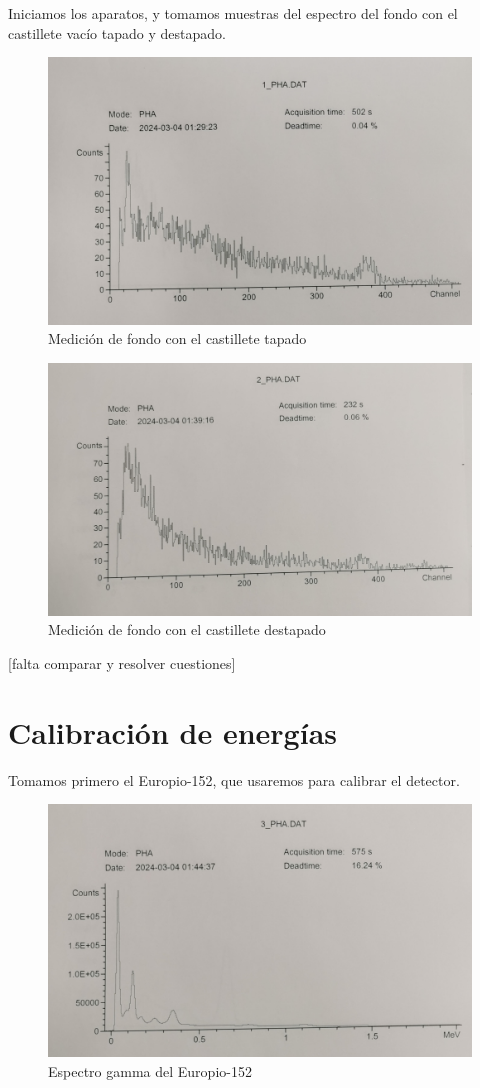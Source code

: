 \documentclass[a4paper,12pt,spanish]{article}
\begin{document}
	Iniciamos los aparatos, y tomamos muestras del espectro del fondo con el castillete vacío tapado y destapado.
	
	
\begin{figure}[H]
	\centering
	\includegraphics[width=0.7\linewidth]{../graficas_procesadas/PHA_1}
	\caption{Medición de fondo con el castillete tapado}
	\label{fig:pha1}
\end{figure}
	
	
\begin{figure}[H]
	\centering
	\includegraphics[width=0.7\linewidth]{../graficas_procesadas/PHA_2}
	\caption{Medición de fondo con el castillete destapado}
	\label{fig:pha2}
\end{figure}


[falta comparar y resolver cuestiones]
	
	\section{Calibración de energías}
	
	Tomamos primero el Europio-152, que usaremos para calibrar el detector.
	
	
\begin{figure}[H]
	\centering
	\includegraphics[width=0.7\linewidth]{../graficas_procesadas/PHA_3}
	\caption{Espectro gamma del Europio-152}
	\label{fig:pha3}
\end{figure}
	
\end{document}
